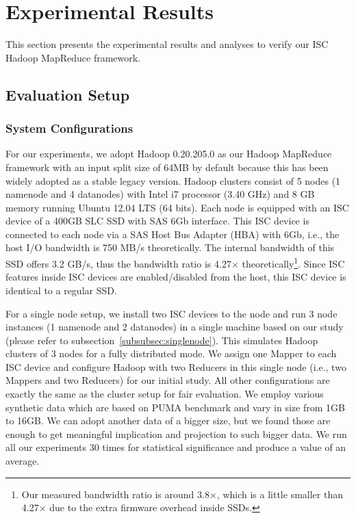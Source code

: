 
\section{Experimental Results}\label{sec:experiments}
This section presents the experimental results and analyses to verify our ISC Hadoop MapReduce framework.

\subsection{Evaluation Setup}\label{subsec:evaluation_setup}

\subsubsection{System Configurations}\label{subsubsec:system_config}
For our experiments, we adopt Hadoop 0.20.205.0 as our Hadoop MapReduce framework with an input split size of 64MB by default because this has been widely adopted as a stable legacy version. 
Hadoop clusters consist of 5 nodes (1 namenode and 4 datanodes) with Intel i7 processor (3.40 GHz) and 8 GB memory running Ubuntu 12.04 LTS (64 bits). Each node is equipped with an ISC device of a 400GB SLC SSD with SAS 6Gb interface. This ISC device is connected to each node via a SAS Host Bus Adapter (HBA) with 6Gb, i.e., the host I/O bandwidth is 750 MB/s theoretically. The internal bandwidth of this SSD offers 3.2 GB/s, thus the bandwidth ratio is 4.27$\times$ theoretically\footnote{\small Our measured bandwidth ratio is around 3.8$\times$, which is a little smaller than 4.27$\times$ due to the extra firmware overhead inside SSDs.}. Since ISC features inside ISC devices are enabled/disabled from the host, this ISC device is identical to a regular SSD.

For a single node setup, we install two ISC devices to the node and run 3 node instances (1 namenode and 2 datanodes) in a single machine based on our study (please refer to subsection~\ref{subsubsec:singlenode}). This simulates Hadoop clusters of 3 nodes for a fully distributed mode. We assign one Mapper to each ISC device and configure Hadoop with two Reducers in this single node (i.e., two Mappers and two Reducers) for our initial study. All other configurations are exactly the same as the cluster setup for fair evaluation. We employ various synthetic data which are based on PUMA benchmark and vary in size from 1GB to 16GB. We can adopt another data of a bigger size, but we found those are enough to get meaningful implication and projection to such bigger data.  
We run all our experiments 30 times for statistical significance and produce a value of an average.


